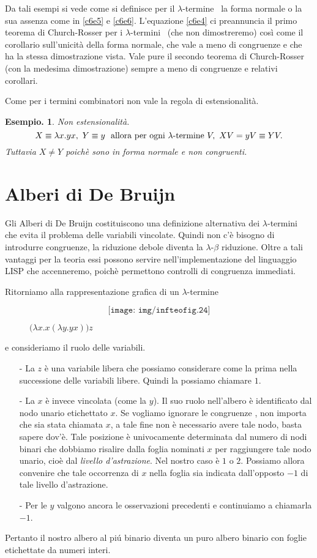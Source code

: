 \documentclass{book}
\newtheorem{esempio}{Esempio.}
\newcommand*{\lbt}{$\lambda$-ter\-mi\-ne}
\newcommand*{\lbts}{$\lambda$-ter\-mi\-ni}
\begin{document}
Da tali esempi si vede come si definisce per il \lbt~ la forma normale o la
sua assenza come in \ref{c6e5} e \ref{c6e6}. L'equazione \ref{c6e4} ci 
preannuncia il primo teorema di Church-Rosser per i \lbts~ (che non 
dimostreremo) cos\`i come il corollario sull'unicit\`a della forma normale, che
vale a meno di congruenze e che ha la stessa dimostrazione vista.
Vale pure il secondo teorema di Church-Rosser (con la medesima dimostrazione)
sempre a meno di congruenze e relativi corollari.

Come per i termini combinatori non vale la regola di estensionalit\`a.

\begin{esempio}Non estensionalit\`a. 
\[
X \equiv \lambda x.yx, \ Y \equiv y \ \text{ allora per ogni \lbt} \ V, \
XV = yV \equiv YV.
\]
Tuttavia $X \neq Y$ poich\`e sono in forma normale e non congruenti.
\end{esempio}

\section{Alberi di De Bruijn}
Gli Alberi di De Bruijn costituiscono una definizione alternativa dei \lbts~
che evita il problema delle variabili vincolate. Quindi non c'\`e bisogno di
introdurre congruenze, la riduzione debole diventa la $\lambda$-$\beta$ 
riduzione. Oltre a tali vantaggi per la teoria essi possono servire 
nell'implementazione del linguaggio LISP che accenneremo, poich\`e permettono
controlli di congruenza immediati.

Ritorniamo alla rappresentazione grafica di un \lbt

\begin{figure}[!ht]
\[\texttt{[image: img/infteofig.24]}\]
\caption{$\bigl(\lambda x.x(\lambda y.yx)\bigr)z$}
\end{figure}
e consideriamo il ruolo delle variabili.
\begin{enumerate}
\item[-]La $z$ \`e una variabile libera che possiamo considerare come la prima
nella successione delle variabili libere. Quindi la possiamo chiamare $1$.
\item[-]La $x$ \`e invece vincolata (come la $y$). Il suo ruolo nell'albero \`e
identificato dal nodo unario etichettato $x$. Se vogliamo ignorare le 
congruenze , non importa che sia stata chiamata $x$, a tale fine non \`e 
necessario avere tale nodo, basta sapere dov'\`e. Tale posizione \`e 
univocamente determinata dal numero di nodi binari che dobbiamo risalire dalla
foglia nominati $x$ per raggiungere tale nodo unario, cio\`e dal \emph{livello
d'astrazione}. Nel nostro caso \`e $1$ o $2$. Possiamo allora convenire che
tale occorrenza di $x$ nella foglia sia indicata dall'opposto $-1$ di tale 
livello d'astrazione.
\item[-]Per le $y$ valgono ancora le osservazioni precedenti e continuiamo a 
chiamarla $-1$.
\end{enumerate}
Pertanto il nostro albero al pi\'u binario diventa un puro albero binario con
foglie etichettate da numeri interi.
\end{document}
